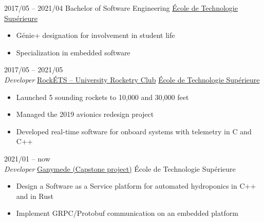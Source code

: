 \documentclass[9pt]{developercv2} %
\begin{document}
\begin{entrylist}
	\setlength\itemsep{-1pt}
	\entry
	{2017/05 -- 2021/04}
	{Bachelor of Software Engineering}
	{\href{https://etsmtl.ca}{École de Technologie Supérieure}}
	{
		\vspace{-14pt}
		\begin{itemize}
			\renewcommand{\labelitemi}{\raisebox{.45ex}{\rule{.6ex}{.6ex}}}
			\setlength\itemsep{-1pt}
			\item Génie+ designation for involvement in student life
			\item Specialization in embedded software
		\end{itemize}
	}
\end{entrylist}

\begin{entrylist}
	\entry
	{2017/05 -- 2021/05\\{\small\emph{Developer}}}
	{\href{https://clubrockets.ca/en/}{RockÉTS -- University Rocketry Club}}
	{\href{https://clubrockets.ca/en/}{École de Technologie Supérieure}}
	{
	\vspace{-14pt}
	\begin{itemize}
		\renewcommand{\labelitemi}{\raisebox{.45ex}{\rule{.6ex}{.6ex}}}
		\setlength\itemsep{-1pt}
		\item Launched 5 sounding rockets to 10,000 and 30,000 feet
		\item Managed the 2019 avionics redesign project
		\item Developed real-time software for onboard systems with telemetry in C and C++
	\end{itemize}
	}
	\entry
	{2021/01 -- now\\{\small\emph{Developer}}}
	{\href{https://github.com/ngc7293/ganymede}{Ganymede (Capstone project)}}
	{École de Technologie Supérieure}
	{
	\vspace{-14pt}
	\begin{itemize}
		\renewcommand{\labelitemi}{\raisebox{.45ex}{\rule{.6ex}{.6ex}}}
		\setlength\itemsep{-1pt}
		\item Design a Software as a Service platform for automated hydroponics in C++ and in Rust
		\item Implement GRPC/Protobuf communication on an embedded platform
	\end{itemize}
	\vspace{-12pt}
	}
\end{entrylist}
\vspace{-\baselineskip}
\end{document}
